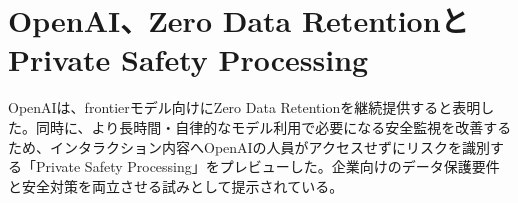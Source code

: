 \section{OpenAI、Zero Data RetentionとPrivate Safety Processing}
OpenAIは、frontierモデル向けにZero Data Retentionを継続提供すると表明した。同時に、より長時間・自律的なモデル利用で必要になる安全監視を改善するため、インタラクション内容へOpenAIの人員がアクセスせずにリスクを識別する「Private Safety Processing」をプレビューした。企業向けのデータ保護要件と安全対策を両立させる試みとして提示されている。
